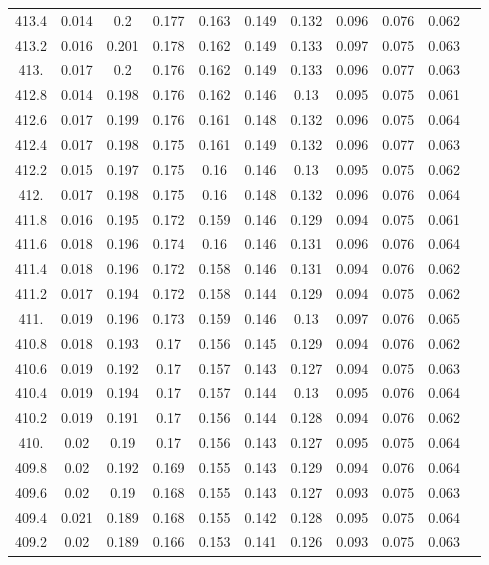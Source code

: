 \documentclass[12pt]{ctexart}
\numberwithin{equation}{section}
\begin{document}
\begin{longtable}{ccccccccccc}
413.4	&	0.014	&	0.2	&	0.177	&	0.163	&	0.149	&	0.132	&	0.096	&	0.076	&	0.062	\\
413.2	&	0.016	&	0.201	&	0.178	&	0.162	&	0.149	&	0.133	&	0.097	&	0.075	&	0.063	\\
413.	&	0.017	&	0.2	&	0.176	&	0.162	&	0.149	&	0.133	&	0.096	&	0.077	&	0.063	\\
412.8	&	0.014	&	0.198	&	0.176	&	0.162	&	0.146	&	0.13	&	0.095	&	0.075	&	0.061	\\
412.6	&	0.017	&	0.199	&	0.176	&	0.161	&	0.148	&	0.132	&	0.096	&	0.075	&	0.064	\\
412.4	&	0.017	&	0.198	&	0.175	&	0.161	&	0.149	&	0.132	&	0.096	&	0.077	&	0.063	\\
412.2	&	0.015	&	0.197	&	0.175	&	0.16	&	0.146	&	0.13	&	0.095	&	0.075	&	0.062	\\
412.	&	0.017	&	0.198	&	0.175	&	0.16	&	0.148	&	0.132	&	0.096	&	0.076	&	0.064	\\
411.8	&	0.016	&	0.195	&	0.172	&	0.159	&	0.146	&	0.129	&	0.094	&	0.075	&	0.061	\\
411.6	&	0.018	&	0.196	&	0.174	&	0.16	&	0.146	&	0.131	&	0.096	&	0.076	&	0.064	\\
411.4	&	0.018	&	0.196	&	0.172	&	0.158	&	0.146	&	0.131	&	0.094	&	0.076	&	0.062	\\
411.2	&	0.017	&	0.194	&	0.172	&	0.158	&	0.144	&	0.129	&	0.094	&	0.075	&	0.062	\\
411.	&	0.019	&	0.196	&	0.173	&	0.159	&	0.146	&	0.13	&	0.097	&	0.076	&	0.065	\\
410.8	&	0.018	&	0.193	&	0.17	&	0.156	&	0.145	&	0.129	&	0.094	&	0.076	&	0.062	\\
410.6	&	0.019	&	0.192	&	0.17	&	0.157	&	0.143	&	0.127	&	0.094	&	0.075	&	0.063	\\
410.4	&	0.019	&	0.194	&	0.17	&	0.157	&	0.144	&	0.13	&	0.095	&	0.076	&	0.064	\\
410.2	&	0.019	&	0.191	&	0.17	&	0.156	&	0.144	&	0.128	&	0.094	&	0.076	&	0.062	\\
410.	&	0.02	&	0.19	&	0.17	&	0.156	&	0.143	&	0.127	&	0.095	&	0.075	&	0.064	\\
409.8	&	0.02	&	0.192	&	0.169	&	0.155	&	0.143	&	0.129	&	0.094	&	0.076	&	0.064	\\
409.6	&	0.02	&	0.19	&	0.168	&	0.155	&	0.143	&	0.127	&	0.093	&	0.075	&	0.063	\\
409.4	&	0.021	&	0.189	&	0.168	&	0.155	&	0.142	&	0.128	&	0.095	&	0.075	&	0.064	\\
409.2	&	0.02	&	0.189	&	0.166	&	0.153	&	0.141	&	0.126	&	0.093	&	0.075	&	0.063	\\

\end{longtable}
\end{document}
